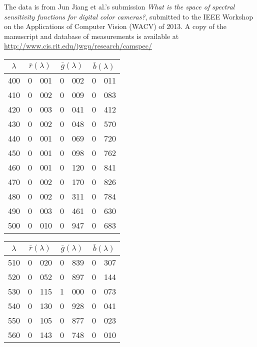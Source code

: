 The data is from Jun Jiang et al.'s submission \textit{What is the space of spectral sensitivity
functions for digital color cameras?}, submitted to the IEEE Workshop on the Applications of Computer
Vision (WACV) of 2013.
A copy of the manuscript and database of measurements is available at 
\url{http://www.cis.rit.edu/jwgu/research/camspec/}

{
\small
{
\centering


\begin{minipage}{.3\textwidth}
\begin{tabular}{c|r@{.}l | r@{.}l | r@{.}l}
$\lambda$ & \multicolumn{2}{c|}{$\bar r(\lambda)$} &  \multicolumn{2}{c|}{$\bar g(\lambda)$} &  \multicolumn{2}{c}{$\bar b(\lambda)$} \\
\hline
 400 &   0&001 &   0&002 &   0&011 \\
 410 &   0&002 &   0&009 &   0&083 \\
 420 &   0&003 &   0&041 &   0&412 \\
 430 &   0&002 &   0&048 &   0&570 \\
 440 &   0&001 &   0&069 &   0&720 \\
 450 &   0&001 &   0&098 &   0&762 \\
 460 &   0&001 &   0&120 &   0&841 \\
 470 &   0&002 &   0&170 &   0&826 \\
 480 &   0&002 &   0&311 &   0&784 \\
 490 &   0&003 &   0&461 &   0&630 \\
 500 &   0&010 &   0&947 &   0&683 \\
\end{tabular}
\end{minipage}\hskip3mm
\begin{minipage}{.3\textwidth}
\begin{tabular}{c|r@{.}l | r@{.}l | r@{.}l}
$\lambda$ & \multicolumn{2}{c|}{$\bar r(\lambda)$} &  \multicolumn{2}{c|}{$\bar g(\lambda)$} &  \multicolumn{2}{c}{$\bar b(\lambda)$} \\
\hline
 510 &   0&020 &   0&839 &   0&307 \\
 520 &   0&052 &   0&897 &   0&144 \\
 530 &   0&115 &   1&000 &   0&073 \\
 540 &   0&130 &   0&928 &   0&041 \\
 550 &   0&105 &   0&877 &   0&023 \\
 560 &   0&143 &   0&748 &   0&010 \\

\end{tabular}
\end{minipage}}}
